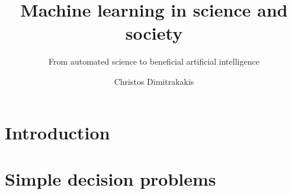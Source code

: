 \documentclass{beamer}
\title{Machine learning in science and society}
\subtitle{From automated science to beneficial artificial intelligence}
\author[C. Dimitrakakis]{Christos Dimitrakakis}
\begin{document}
\begin{frame}
  \titlepage
\end{frame}

\chapter{Introduction}


\chapter{Simple decision problems}












\end{document}
